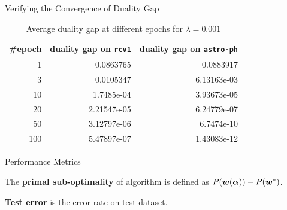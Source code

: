 \begin{frame}{Verifying the Convergence of Duality Gap}
\begin{table}[htbp]
    \centering
    \caption{Average duality gap at different epochs for $\lambda = 0.001$} 
    \label{table:covdual1}
    \begin{tabular}{|r|r|r|}
        \hline
        \#epoch & duality gap on \texttt{rcv1} & duality gap on \texttt{astro-ph} \\ 
        \hline
        1 & 0.0863765 & 0.0883917\\
        3 & 0.0105347 & 6.13163e-03 \\
        10 & 1.7485e-04 & 3.93673e-05 \\
        20 & 2.21547e-05 & 6.24779e-07 \\
        50 & 3.12797e-06 & 6.7474e-10\\
        100 & 5.47897e-07 & 1.43083e-12 \\
        \hline
    \end{tabular}
\end{table}
\end{frame}

\begin{frame}{Performance Metrics}
\begin{definition}\label{def:psds}
The \textbf{primal sub-optimality} of algorithm is defined as $P(\bm{w}(\bm{\alpha})) - P(\bm{w}^*)$. 
\end{definition}
\begin{definition}
\textbf{Test error} is the error rate on test dataset.
\end{definition}
\end{frame}

